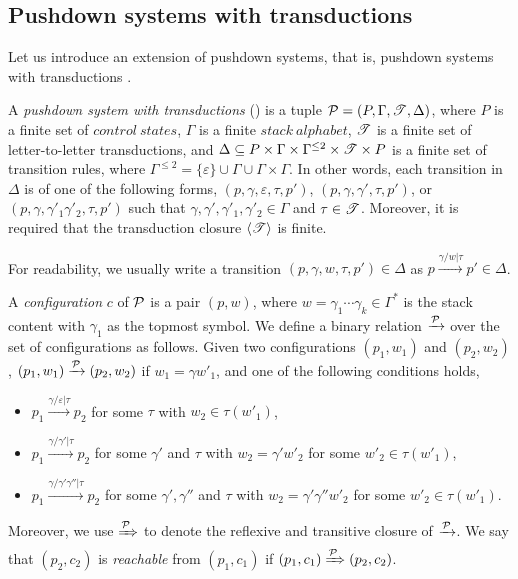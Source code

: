 \subsection{Pushdown systems with transductions}

Let us introduce an extension of pushdown systems, that is, pushdown systems with transductions \cite{UM13,Song18}. 

\begin{definition}[\TrPDS] \label{def:trpds}
    A \emph{pushdown system with transductions} (\TrPDS) is a tuple ${\mathcal{P} } = (P, \Gamma, {\mathscr{T} }, \Delta)$, 
    where $P$ is a finite set of $control\ states$, $\Gamma$ is a finite $stack\ alphabet$, ${\mathscr{T} }$ is a finite set of letter-to-letter transductions, and $\Delta \subseteq P \times \Gamma \times \Gamma^{\le 2} \times {\mathscr{T} } \times P$ is a finite set of transition rules, where $\Gamma^{\le 2} = \{\varepsilon\} \cup \Gamma \cup \Gamma \times \Gamma$. In other words, each transition in $\Delta$ is of one of the following forms, $(p, \gamma, \varepsilon, \tau, p')$, $(p, \gamma, \gamma',\tau, p')$, or $(p, \gamma, \gamma'_1 \gamma'_2, \tau, p')$ such that $\gamma, \gamma', \gamma'_1, \gamma'_2 \in \Gamma$ and $\tau \in {\mathscr{T} }$. 
   Moreover, it is required that the transduction closure $\langle {\mathscr{T} } \rangle$ is finite.  
\end{definition}
For readability, we usually write a transition $(p, \gamma, w, \tau, p') \in \Delta$ as $p \xrightarrow{\gamma/w | \tau} p' \in \Delta$.

A \emph{configuration} $c$ of ${\mathcal{P} }$ is a pair $(p, w)$, where $w = \gamma_1 \cdots \gamma_k \in \Gamma^*$ is the  stack content with $\gamma_1$ as the topmost symbol. We define a binary relation $\xrightarrow{{\mathcal{P} }}$ over the set of configurations as follows. Given two configurations $(p_1, w_1)$ and $(p_2, w_2)$, $(p_1, w_1) \xrightarrow{{\mathcal{P} }} (p_2, w_2)$ if $w_1 = \gamma w'_1$, and one of the following conditions holds,
\begin{itemize}
\item $p_1 \xrightarrow{\gamma/\varepsilon|\tau} p_2$ for some $\tau$ with  $w_2 \in \tau(w'_1)$, 
%
\item $p_1 \xrightarrow{\gamma/\gamma'|\tau} p_2$ for some $\gamma'$ and $\tau$ with $w_2 = \gamma' w'_2$ for some $w'_2 \in \tau(w'_1)$, 
%
\item $p_1 \xrightarrow{\gamma/\gamma' \gamma''|\tau} p_2$ for some $\gamma', \gamma''$ and $\tau$ with $w_2 = \gamma' \gamma'' w'_2$ for some $w'_2 \in \tau(w'_1)$.
\end{itemize}
Moreover, we use $\xRightarrow{{\mathcal{P} }}$ to denote the reflexive and transitive closure of $\xrightarrow{{\mathcal{P} }}$. We say that $(p_2, c_2)$ is \emph{reachable} from $(p_1, c_1)$ if $(p_1, c_1) \xRightarrow{{\mathcal{P} }} (p_2, c_2)$.

